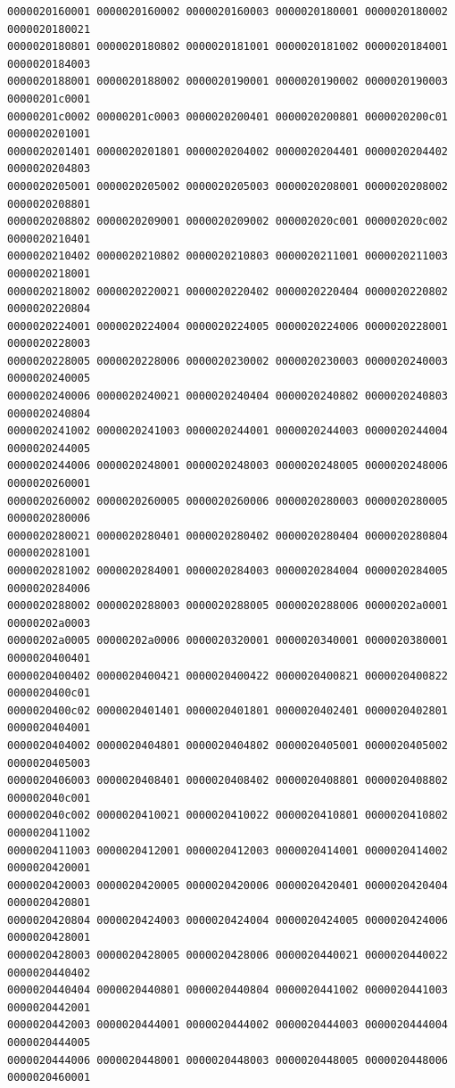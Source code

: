 \begin{Verbatim}[fontsize=\scriptsize]
0000020160001 0000020160002 0000020160003 0000020180001 0000020180002 0000020180021
0000020180801 0000020180802 0000020181001 0000020181002 0000020184001 0000020184003
0000020188001 0000020188002 0000020190001 0000020190002 0000020190003 00000201c0001
00000201c0002 00000201c0003 0000020200401 0000020200801 0000020200c01 0000020201001
0000020201401 0000020201801 0000020204002 0000020204401 0000020204402 0000020204803
0000020205001 0000020205002 0000020205003 0000020208001 0000020208002 0000020208801
0000020208802 0000020209001 0000020209002 000002020c001 000002020c002 0000020210401
0000020210402 0000020210802 0000020210803 0000020211001 0000020211003 0000020218001
0000020218002 0000020220021 0000020220402 0000020220404 0000020220802 0000020220804
0000020224001 0000020224004 0000020224005 0000020224006 0000020228001 0000020228003
0000020228005 0000020228006 0000020230002 0000020230003 0000020240003 0000020240005
0000020240006 0000020240021 0000020240404 0000020240802 0000020240803 0000020240804
0000020241002 0000020241003 0000020244001 0000020244003 0000020244004 0000020244005
0000020244006 0000020248001 0000020248003 0000020248005 0000020248006 0000020260001
0000020260002 0000020260005 0000020260006 0000020280003 0000020280005 0000020280006
0000020280021 0000020280401 0000020280402 0000020280404 0000020280804 0000020281001
0000020281002 0000020284001 0000020284003 0000020284004 0000020284005 0000020284006
0000020288002 0000020288003 0000020288005 0000020288006 00000202a0001 00000202a0003
00000202a0005 00000202a0006 0000020320001 0000020340001 0000020380001 0000020400401
0000020400402 0000020400421 0000020400422 0000020400821 0000020400822 0000020400c01
0000020400c02 0000020401401 0000020401801 0000020402401 0000020402801 0000020404001
0000020404002 0000020404801 0000020404802 0000020405001 0000020405002 0000020405003
0000020406003 0000020408401 0000020408402 0000020408801 0000020408802 000002040c001
000002040c002 0000020410021 0000020410022 0000020410801 0000020410802 0000020411002
0000020411003 0000020412001 0000020412003 0000020414001 0000020414002 0000020420001
0000020420003 0000020420005 0000020420006 0000020420401 0000020420404 0000020420801
0000020420804 0000020424003 0000020424004 0000020424005 0000020424006 0000020428001
0000020428003 0000020428005 0000020428006 0000020440021 0000020440022 0000020440402
0000020440404 0000020440801 0000020440804 0000020441002 0000020441003 0000020442001
0000020442003 0000020444001 0000020444002 0000020444003 0000020444004 0000020444005
0000020444006 0000020448001 0000020448003 0000020448005 0000020448006 0000020460001

\end{Verbatim}
